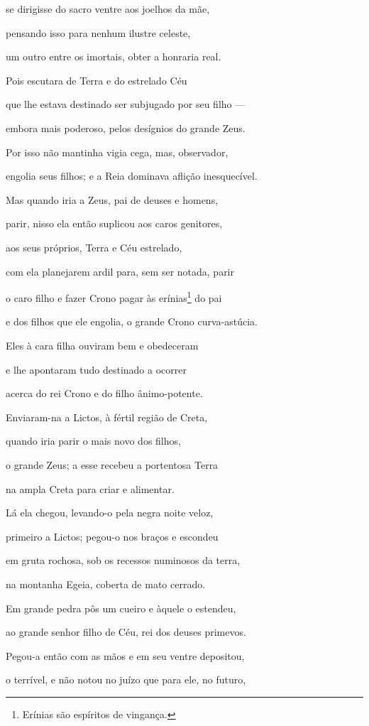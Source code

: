 \begin{pages}
\begin{Rightside}
se dirigisse do sacro ventre aos joelhos da mãe, 

pensando isso para nenhum ilustre celeste,

um outro entre os imortais, obter a honraria real.

Pois escutara de Terra e do estrelado Céu

que lhe estava destinado ser subjugado por seu filho ---

embora mais poderoso, pelos desígnios do grande Zeus. 

Por isso não mantinha vigia cega, mas, observador,

engolia seus filhos; e a Reia dominava aflição inesquecível.

Mas quando iria a Zeus, pai de deuses e homens,

parir, nisso ela então suplicou aos caros genitores,

aos seus próprios, Terra e Céu estrelado, 

com ela planejarem ardil para, sem ser notada, parir

o caro filho e fazer Crono pagar às erínias\footnote{Erínias são espíritos de vingança.} do pai

e dos filhos que ele engolia, o grande Crono curva-astúcia.

Eles à cara filha ouviram bem e obedeceram

e lhe apontaram tudo destinado a ocorrer 

acerca do rei Crono e do filho ânimo-potente.

Enviaram-na a Lictos, à fértil região de Creta,

quando iria parir o mais novo dos filhos,

o grande Zeus; a esse recebeu a portentosa Terra

na ampla Creta para criar e alimentar. 

Lá ela chegou, levando-o pela negra noite veloz,

primeiro a Lictos; pegou-o nos braços e escondeu

em gruta rochosa, sob os recessos numinosos da terra,

na montanha Egeia, coberta de mato cerrado.

Em grande pedra pôs um cueiro e àquele o estendeu, 

ao grande senhor filho de Céu, rei dos deuses primevos.

Pegou-a então com as mãos e em seu ventre depositou,

o terrível, e não notou no juízo que para ele, no futuro,


\end{Rightside}
\end{pages}
